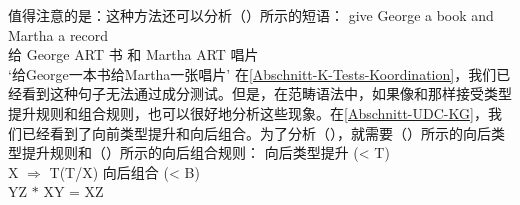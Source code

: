 \begin{exe}
\begin{xlist}[iv.]
\begin{exe}
\begin{xlist}[iv.]
值得注意的是：这种方法还可以分析（）所示的短语：
\ea
\label{Beispiel-Gapping-Steedman}
\gll give George a book and Martha a record\\
     给 George ART 书 和 Martha ART 唱片\\
\glt `给George一本书给Martha一张唱片'
\z
在\ref{Abschnitt-K-Tests-Koordination}，我们已经看到这种句子无法通过成分测试。但是，在范畴语法中，如果像\citet{Dowty88a-u}和\citet{Steedman91a}那样接受类型提升规则和组合规则，也可以很好地分析这些现象。在\ref{Abschnitt-UDC-KG}，我们已经看到了向前类型提升和向后组合。为了分析（），就需要（）所示的向后类型提升规则和（）所示的向后组合规则：
\ea
向后类型提升 (< T)\\
X $\Rightarrow$ T\bs (T/X)
\z
\ea
向后组合 (< B)\\
    Y\bs Z $*$ X\bs Y = X\bs Z
\z


\end{xlist}
\end{exe}
\end{xlist}
\end{exe}
